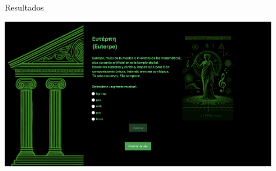 \documentclass{beamer}
\newcommand{\currentsectionindex}{0}
\begin{document}
\begin{frame}{Resultados}
  \vspace{-1cm}
  \begin{center}
  \includegraphics[width=0.9\textwidth]{images/euterpe-screenshot.png}
  \end{center}
\end{frame}



 
 





\renewcommand{\currentsectionindex}{6}
\end{document}
